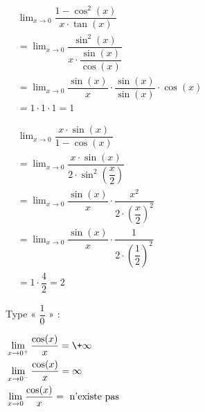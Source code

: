 {\begin{tasks}
\task

\( \begin{aligned}
&\lim_{x \to 0} \dfrac{1 - \cos^2(x)}{x \cdot \tan(x)} \\
&= \lim_{x \to 0} \dfrac{\sin^2(x)}{x \cdot \dfrac{\sin(x)}{\cos(x)}} \\
&= \lim_{x \to 0} \dfrac{\sin(x)}{x} \cdot \dfrac{\sin(x)}{\sin(x)} \cdot \cos(x) \\
&= 1 \cdot 1 \cdot 1 = 1
\end{aligned} \)

\task 

\( \begin{aligned}
&\lim_{x \to 0} \dfrac{x \cdot \sin(x)}{1 - \cos(x)} \\
&= \lim_{x \to 0} \dfrac{x \cdot \sin(x)}{2 \cdot \sin^2\left(\dfrac{x}{2}\right)} \\
&= \lim_{x \to 0} \dfrac{\sin(x)}{x} \cdot \dfrac{x^2}{2 \cdot \left(\dfrac{x}{2}\right)^2} \\
&= \lim_{x \to 0} \dfrac{\sin(x)}{x} \cdot \dfrac{1}{2 \cdot \left(\dfrac{1}{2}\right)^2} \\
&= 1 \cdot \dfrac{4}{2}= 2 
\end{aligned} \)

\task Type « $\dfrac{1}{0}$ » :

\( \begin{aligned}
&\lim_{x \to 0^+} \dfrac{\cos(x)}{x}=\+\infty \\
&\lim_{x \to 0^-} \dfrac{\cos(x)}{x}=\-\infty \\
&\lim_{x \to 0} \dfrac{\cos(x)}{x}=\text{ n'existe pas}\\
\end{aligned} \)
\end{tasks}

}

